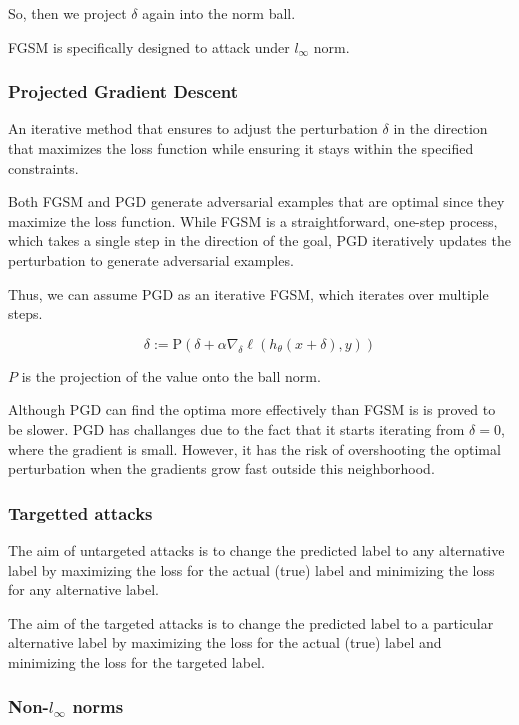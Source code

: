 So, then we project $\delta$ again into the norm ball.  


FGSM is specifically designed to attack under $l_\infty$ norm. 


\subsubsection{Projected Gradient Descent}

An iterative method that ensures to adjust the perturbation $\delta$ in the direction that maximizes the loss function 
while ensuring it stays within the specified constraints.

Both FGSM and PGD generate adversarial examples that are optimal since they maximize the loss function.
While FGSM is a straightforward, one-step process, which takes a single step in the direction of the goal,
PGD iteratively updates the perturbation to generate adversarial examples. 

Thus, we can assume PGD as an iterative FGSM, which iterates over multiple steps.

\[\delta := \text{P}(\delta + \alpha \nabla_{\delta} \ell(h_\theta(x + \delta), y))\]

$P$ is the projection of the value onto the ball norm.

Although PGD can find the optima more effectively than FGSM is is proved to be slower. PGD has challanges due to the fact that it starts iterating 
from $\delta = 0$, where the gradient is small. However, it has the risk of overshooting the optimal 
perturbation when the gradients grow fast outside this neighborhood. 


\subsubsection{Targetted attacks}

The aim of untargeted attacks is to change the predicted label to any alternative label 
by maximizing the loss for the actual (true) label and minimizing the loss for any alternative label. 

The aim of the targeted attacks is to change the predicted label to a particular alternative label 
by maximizing the loss for the actual (true) label and minimizing the loss for the targeted label. 


\subsubsection{Non-$l_{\infty}$ norms}

